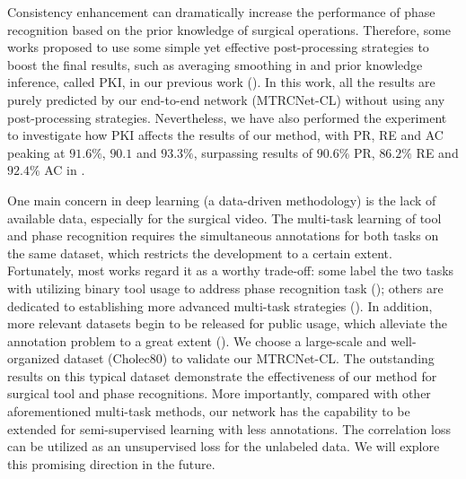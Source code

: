 \documentclass{elsarticle}
\begin{document}
Consistency enhancement can dramatically increase the performance of phase recognition based on the prior knowledge of surgical operations.
Therefore, some works proposed to use some simple yet effective post-processing strategies to boost the final results, such as averaging smoothing in \cite{cadene2016m2cai} and prior knowledge inference, called PKI, in our previous work (\cite{jin2018sv}).
In this work, all the results are purely predicted by our end-to-end network (MTRCNet-CL) without using any post-processing strategies.
Nevertheless, we have also performed the experiment to investigate how PKI affects the results of our method, with PR, RE and AC peaking at $91.6\%$, $90.1$ and $93.3\%$, surpassing results of $90.6\%$ PR, $86.2\%$ RE and $92.4\%$ AC in \cite{jin2018sv}.


One main concern in deep learning (a data-driven methodology) is the lack of available data, especially for the surgical video.
The multi-task learning of tool and phase recognition requires the simultaneous annotations for both tasks on the same dataset, which restricts the development to a certain extent.
Fortunately, most works regard it as a worthy trade-off: some label the two tasks with utilizing binary tool usage to address phase recognition task (\cite{padoy2012statistical,yu2019assessment}); others are dedicated to establishing more advanced multi-task strategies (\cite{zisimopoulos2018deepphase,nakawala2019deep}).
In addition, more relevant datasets begin to be released for public usage, which alleviate the annotation problem to a great extent (\cite{nakawala2019deep,miccai2018}).
We choose a large-scale and well-organized dataset (Cholec80) to validate our MTRCNet-CL. The outstanding results on this typical dataset demonstrate the effectiveness of our method for surgical tool and phase recognitions.
More importantly, compared with other aforementioned multi-task methods, our network has the capability to be extended for semi-supervised learning with less annotations.
The correlation loss can be utilized as an unsupervised loss for the unlabeled data. We will explore this promising direction in the future.
\end{document}
